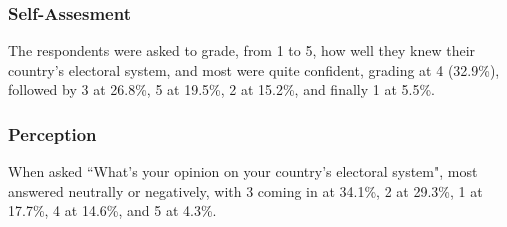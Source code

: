 \documentclass{article}
\begin{document}
\subsubsection{Self-Assesment}
The respondents were asked to grade, from 1 to 5, how well they knew their country's electoral system, and most were quite confident, grading at 4 (32.9\%), followed by 3 at 26.8\%, 5 at 19.5\%, 2 at 15.2\%, and finally 1 at 5.5\%.

\subsubsection{Perception}
When asked ``What's your opinion on your country's electoral system", most answered neutrally or negatively, with 3 coming in at 34.1\%, 2 at 29.3\%, 1 at 17.7\%, 4 at 14.6\%, and 5 at 4.3\%.



\printbibliography
	
\end{document}
